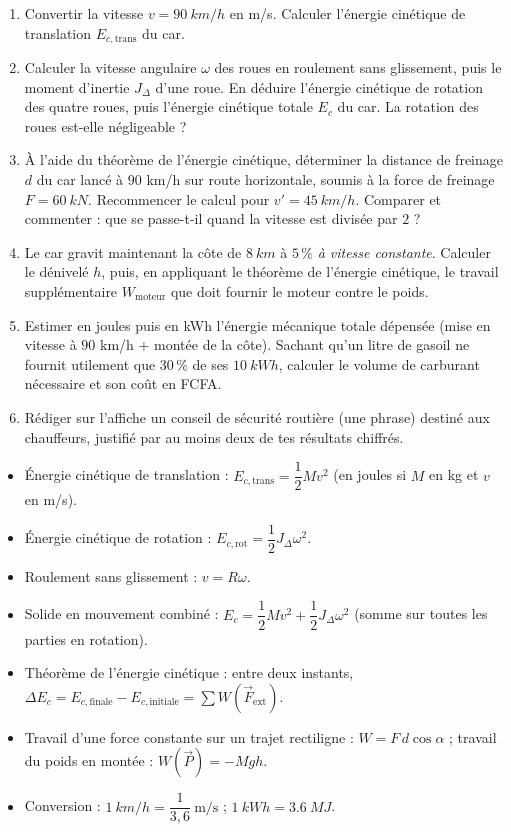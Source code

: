 \documentclass[11pt]{article}
\newcounter{popsec}
\newcounter{popsub}
\newcommand{\courssub}[1]{%
  \stepcounter{popsub}%
  \par\vspace{9pt}\noindent{\popxbold\fontsize{11.5}{13}\selectfont\color{popink}{\color{poporange}\thepopsec.\thepopsub}\hspace{6pt}#1}\par\nopagebreak\vspace{4pt}
}
\begin{document}
\begin{enumerate}
\item Convertir la vitesse $v = \SI{90}{km/h}$ en m/s. Calculer l'énergie cinétique de translation $E_{c,\text{trans}}$ du car.
\item Calculer la vitesse angulaire $\omega$ des roues en roulement sans glissement, puis le moment d'inertie $J_{\Delta}$ d'une roue. En déduire l'énergie cinétique de rotation des quatre roues, puis l'énergie cinétique totale $E_c$ du car. La rotation des roues est-elle négligeable ?
\item À l'aide du théorème de l'énergie cinétique, déterminer la distance de freinage $d$ du car lancé à $90$ km/h sur route horizontale, soumis à la force de freinage $F = \SI{60}{kN}$. Recommencer le calcul pour $v' = \SI{45}{km/h}$. Comparer et commenter : que se passe-t-il quand la vitesse est divisée par $2$ ?
\item Le car gravit maintenant la côte de $\SI{8}{km}$ à $5\,\%$ \emph{à vitesse constante}. Calculer le dénivelé $h$, puis, en appliquant le théorème de l'énergie cinétique, le travail supplémentaire $W_{\text{moteur}}$ que doit fournir le moteur contre le poids.
\item Estimer en joules puis en kWh l'énergie mécanique totale dépensée (mise en vitesse à $90$ km/h + montée de la côte). Sachant qu'un litre de gasoil ne fournit utilement que $30\,\%$ de ses $\SI{10}{kWh}$, calculer le volume de carburant nécessaire et son coût en FCFA.
\item Rédiger sur l'affiche un conseil de sécurité routière (une phrase) destiné aux chauffeurs, justifié par au moins deux de tes résultats chiffrés.
\end{enumerate}

\courssub{Ressources à mobiliser}

\begin{aretenir}
\begin{itemize}
\item Énergie cinétique de translation : $E_{c,\text{trans}} = \dfrac{1}{2}Mv^{2}$ (en joules si $M$ en kg et $v$ en m/s).
\item Énergie cinétique de rotation : $E_{c,\text{rot}} = \dfrac{1}{2}J_{\Delta}\omega^{2}$.
\item Roulement sans glissement : $v = R\omega$.
\item Solide en mouvement combiné : $E_c = \dfrac{1}{2}Mv^{2} + \dfrac{1}{2}J_{\Delta}\omega^{2}$ (somme sur toutes les parties en rotation).
\item Théorème de l'énergie cinétique : entre deux instants, $\Delta E_c = E_{c,\text{finale}} - E_{c,\text{initiale}} = \sum W(\vec{F}_{\text{ext}})$.
\item Travail d'une force constante sur un trajet rectiligne : $W = F\,d\cos\alpha$ ; travail du poids en montée : $W(\vec{P}) = -Mgh$.
\item Conversion : $\SI{1}{km/h} = \dfrac{1}{3,6}\ \text{m/s}$ ; $\SI{1}{kWh} = \SI{3,6}{MJ}$.
\end{itemize}
\end{aretenir}
\end{document}
